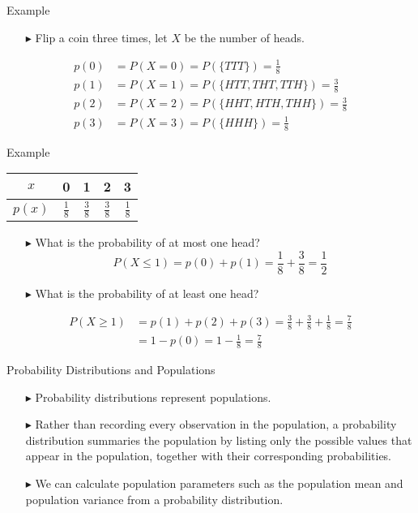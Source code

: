 \documentclass[12pt]{beamer}
\begin{document}
\begin{frame}{Example}
\begin{itemize}
	\item[\color{blue}$\blacktriangleright$] Flip a coin three times, let $X$ be the number of heads.
\end{itemize}

\begin{align*}
	p(0) &= P(X = 0) = P(\{TTT\}) = \frac{1}{8} \\[1em]
	p(1) &= P(X = 1) = P(\{HTT, THT, TTH\}) = \frac{3}{8} \\[1em]
	p(2) &= P(X = 2) = P(\{HHT, HTH, THH\}) = \frac{3}{8} \\[1em]
	p(3) &= P(X = 3) = P(\{HHH\}) = \frac{1}{8}
\end{align*}
\end{frame}

\begin{frame}{Example}
	\begin{center}
	\begin{tabular}{ccccc}
		\toprule
		$x$&0&1&2&3\\
		\toprule
		$p(x)$&$\frac{1}{8}$&$\frac{3}{8}$&$\frac{3}{8}$&$\frac{1}{8}$\\
		\bottomrule
	\end{tabular}
\end{center}


\begin{itemize}
	\item[\color{blue}$\blacktriangleright$] What is the probability of at most one head?
	$$P(X \leq 1) = p(0) + p(1) = \frac{1}{8} + \frac{3}{8} = \frac{1}{2}$$
\item[\color{blue}$\blacktriangleright$] What is the probability of at least one head?
\end{itemize}
	\begin{align*}
	P(X \geq 1) &= p(1) + p(2) + p(3) = \frac{3}{8} + \frac{3}{8} + \frac{1}{8} = \frac{7}{8}\\
	&= 1 - p(0) = 1 - \frac{1}{8} = \frac{7}{8}
\end{align*}
\end{frame}

\begin{frame}{Probability Distributions and Populations}
	
	\begin{itemize}
		\item[\color{blue}$\blacktriangleright$] Probability distributions represent populations.
		\item[\color{blue}$\blacktriangleright$] Rather than recording every observation in the population, a probability distribution summaries the population by listing only the possible values that appear in the population, together with their corresponding probabilities.
		\item[\color{blue}$\blacktriangleright$] We can calculate population parameters such as the population mean and population variance from a probability distribution.
	\end{itemize}
	
\end{frame}
\end{document}
